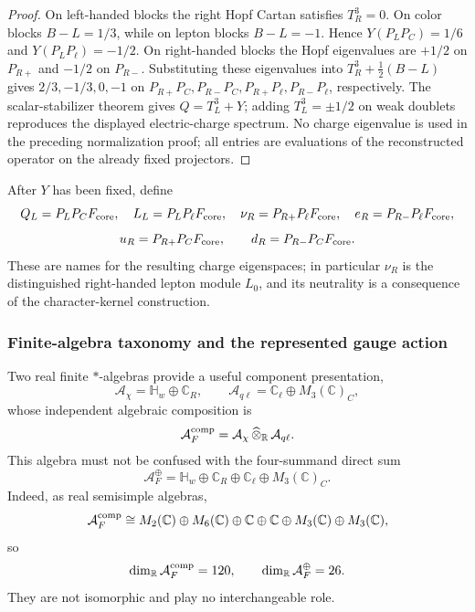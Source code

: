 \documentclass[11pt,a4paper]{article}
\begin{document}
\begin{proof}
On left-handed blocks the right Hopf Cartan satisfies \(T_R^3=0\).  On color
blocks \(B-L=1/3\), while on lepton blocks \(B-L=-1\).  Hence
\(Y(P_LP_C)=1/6\) and \(Y(P_LP_\ell)=-1/2\).  On right-handed blocks the
Hopf eigenvalues are \(+1/2\) on \(P_{R+}\) and \(-1/2\) on \(P_{R-}\).
Substituting these eigenvalues into \(T_R^3+\frac12(B-L)\) gives
\(2/3,-1/3,0,-1\) on
\(P_{R+}P_C,P_{R-}P_C,P_{R+}P_\ell,P_{R-}P_\ell\), respectively.  The
scalar-stabilizer theorem gives \(Q=T_L^3+Y\); adding
\(T_L^3=\pm1/2\) on weak doublets reproduces the displayed electric-charge
spectrum.  No charge eigenvalue is used in the preceding normalization
proof; all entries are evaluations of the reconstructed operator on the
already fixed projectors.
\end{proof}

\begin{corollary}
\label{p5:cor:part1-matter-names-after-Y}
After \(Y\) has been fixed, define
\[
Q_L=P_LP_CF_{\rm core},\quad L_L=P_LP_\ell F_{\rm core},\quad
\nu_R=P_{R+}P_\ell F_{\rm core},\quad e_R=P_{R-}P_\ell F_{\rm core},
\]
\[
u_R=P_{R+}P_CF_{\rm core},\qquad d_R=P_{R-}P_CF_{\rm core}.
\]
These are names for the resulting charge eigenspaces; in particular
\(\nu_R\) is the distinguished right-handed lepton module \(L_0\), and its
neutrality is a consequence of the character-kernel construction.
\end{corollary}

\subsubsection{Finite-algebra taxonomy and the represented gauge action}
\label{p5:sec:part1-finite-algebra}

Two real finite \(*\)-algebras provide a useful component presentation,
\[
\mathcal A_{\chi}=\mathbb H_w\oplus\mathbb C_R,
\qquad
\mathcal A_{q\ell}=\mathbb C_\ell\oplus M_3(\mathbb C)_C,
\]
whose independent algebraic composition is
\begin{equation}
\label{p5:eq:part1-finite-algebra}
\mathcal A_F^{\rm comp}
=
\mathcal A_{\chi}\,\widehat\otimes_{\mathbb R}\,\mathcal A_{q\ell}.
\end{equation}
This algebra must not be confused with the four-summand direct sum
\[
\mathcal A_F^\oplus
=
\mathbb H_w\oplus\mathbb C_R\oplus\mathbb C_\ell\oplus M_3(\mathbb C)_C.
\]
Indeed, as real semisimple algebras,
\begin{equation}
\label{p5:eq:part1-finite-algebra-decomposition}
\mathcal A_F^{\rm comp}
\cong
M_2(\mathbb C)\oplus M_6(\mathbb C)
\oplus\mathbb C\oplus\mathbb C
\oplus M_3(\mathbb C)\oplus M_3(\mathbb C),
\end{equation}
so
\[
\dim_{\mathbb R}\mathcal A_F^{\rm comp}=120,
\qquad
\dim_{\mathbb R}\mathcal A_F^\oplus=26.
\]
They are not isomorphic and play no interchangeable role.
\end{document}
